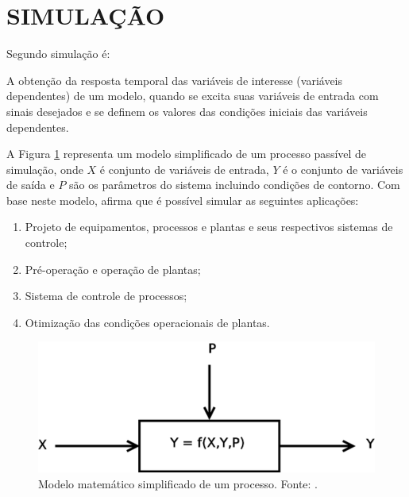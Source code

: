 \section{SIMULAÇÃO} 

Segundo  simulação é:

\begin{citacao}
A obtenção da resposta temporal das variáveis de interesse (variáveis dependentes) de um modelo, quando se excita suas variáveis de entrada com sinais desejados e se definem os valores das condições iniciais das variáveis dependentes.
\end{citacao}

A Figura \ref{simulacao} representa um modelo simplificado de um processo passível de simulação, onde $X$ é conjunto de variáveis de entrada, $Y$ é o conjunto de variáveis de saída e $P$ são os parâmetros do sistema incluindo condições de contorno. 
Com base neste modelo,  afirma que é possível simular as seguintes aplicações:
\begin{enumerate}
	\item Projeto de equipamentos, processos e plantas e seus respectivos sistemas de controle;
	\item Pré-operação e operação de plantas;
	\item Sistema de controle de processos;
	\item Otimização das condições operacionais de plantas.
\end{enumerate}


\begin{figure}[ht]
	\centering
	\includegraphics[width=10 cm]{figuras/simulacao.eps}
	\caption{Modelo matemático simplificado de um processo. Fonte: .}
    	\label{simulacao}
\end{figure}
